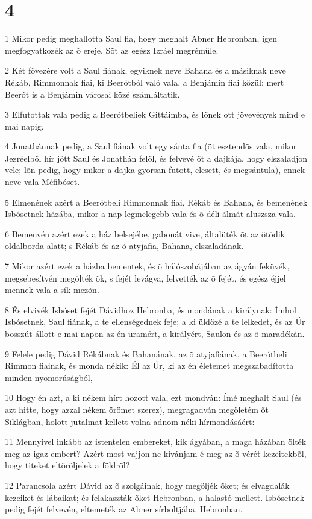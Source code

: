 \chapter{4}

\par 1 Mikor pedig meghallotta Saul fia, hogy meghalt Abner Hebronban, igen megfogyatkozék az õ ereje. Sõt az egész Izráel megrémüle.
\par 2 Két fõvezére volt a Saul fiának, egyiknek neve Bahana és a másiknak neve Rékáb, Rimmonnak fiai, ki Beerótból való vala, a Benjámin fiai közül; mert Beerót is a Benjámin városai közé számláltatik.
\par 3 Elfutottak vala pedig a Beerótbeliek Gittáimba, és lõnek ott jövevények mind e mai napig.
\par 4 Jonathánnak pedig, a Saul fiának volt egy sánta fia (öt esztendõs vala, mikor Jezréelbõl hír jött Saul és Jonathán felõl, és felvevé õt a dajkája, hogy elszaladjon vele; lõn pedig, hogy mikor a dajka gyorsan futott, elesett, és megsántula), ennek neve vala Méfibóset.
\par 5 Elmenének azért a Beerótbeli Rimmonnak fiai, Rékáb és Bahana, és bemenének Isbósetnek házába, mikor a nap legmelegebb vala és õ déli álmát aluszsza vala.
\par 6 Bemenvén azért ezek a ház belsejébe, gabonát vive, általüték õt az ötödik oldalborda alatt; s Rékáb és az õ atyjafia, Bahana, elszaladának.
\par 7 Mikor azért ezek a házba bementek, és õ hálószobájában az ágyán feküvék, megsebesítvén megölték õk, s fejét levágva, felvették az õ fejét, és egész éjjel mennek vala a sík mezõn.
\par 8 És elvivék Isbóset fejét Dávidhoz Hebronba, és mondának a királynak: Ímhol Isbósetnek, Saul fiának, a te ellenségednek feje; a ki üldözé a te lelkedet, és az Úr bosszút állott e mai napon az én uramért, a királyért, Saulon és az õ maradékán.
\par 9 Felele pedig Dávid Rékábnak és Bahanának, az õ atyjafiának, a Beerótbeli Rimmon fiainak, és monda nékik: Él az Úr, ki az én életemet megszabadította minden nyomorúságból,
\par 10 Hogy én azt, a ki nékem hírt hozott vala, ezt mondván: Ímé meghalt Saul (és azt hitte, hogy azzal nékem örömet szerez), megragadván megöletém õt Siklágban, holott jutalmat kellett volna adnom néki hírmondásáért:
\par 11 Mennyivel inkább az istentelen embereket, kik ágyában, a maga házában ölték meg az igaz embert? Azért most vajjon ne kivánjam-é meg az õ vérét kezeitekbõl, hogy titeket eltöröljelek a földrõl?
\par 12 Parancsola azért Dávid az õ szolgáinak, hogy megöljék õket; és elvagdalák kezeiket és lábaikat; és felakaszták õket Hebronban, a halastó mellett. Isbósetnek pedig fejét felvevén, eltemeték az Abner  sírboltjába, Hebronban.


